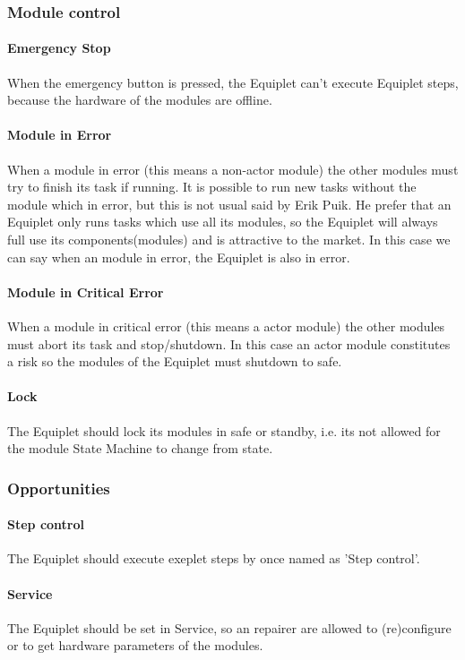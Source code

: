 \documentclass[12pt,a4paper]{report}
\begin{document}
\subsubsection{Module control}
\paragraph{Emergency Stop}
When the emergency button is pressed, the Equiplet can't execute Equiplet steps, because the hardware of the modules are offline.
\paragraph{Module in Error}
When a module in error (this means a non-actor module) the other modules must try to finish its task if running. It is possible to run new tasks without the module which in error, but this is not usual said by Erik Puik. He prefer that an Equiplet only runs tasks which use all its modules, so the Equiplet will always full use its components(modules) and is attractive to the market. In this case we can say when an module in error, the Equiplet is also in error.
\paragraph{Module in Critical Error}
When a module in critical error (this means a actor module) the other modules must abort its task and stop/shutdown. In this case an actor module constitutes a risk so the modules of the Equiplet must shutdown to safe.
\paragraph{Lock}The Equiplet should lock its modules in safe or standby, i.e. its not allowed for the module State Machine to change from state.

\subsubsection{Opportunities}
\paragraph{Step control}The Equiplet should execute exeplet steps by once named as 'Step control'.
\paragraph{Service}The Equiplet should be set in Service, so an repairer are allowed to (re)configure or to get hardware parameters of the modules.
\end{document}
